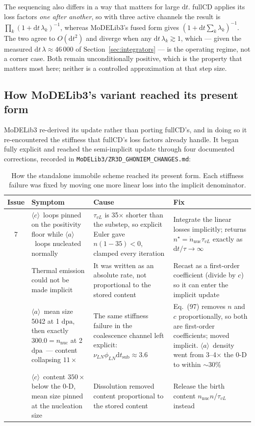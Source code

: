\documentclass[11pt,a4paper]{article}
\newcommand{\code}[1]{\texttt{\small #1}}
\newcommand{\dpa}{\ensuremath{\mathrm{dpa}}}
\newcommand{\aloop}{\ensuremath{\langle a\rangle}}
\newcommand{\cloop}{\ensuremath{\langle c\rangle}}
\begin{document}
The sequencing also differs in a way that matters for large $\mathrm dt$.
fullCD applies its loss factors \emph{one after another}, so with three active
channels the result is $\prod_k (1+\mathrm dt\,\lambda_k)^{-1}$, whereas
MoDELib3's fused form gives $(1+\mathrm dt\sum_k \lambda_k)^{-1}$. The two agree
to $O(\mathrm dt^2)$ and diverge when any $\mathrm dt\,\lambda_k \gtrsim 1$,
which --- given the measured $\mathrm dt\,\lambda \approx 46\,000$ of
Section~\ref{sec:integrators} --- is the operating regime, not a corner case.
Both remain unconditionally positive, which is the property that matters most
here; neither is a controlled approximation at that step size.

\subsection{How MoDELib3's variant reached its present form}

MoDELib3 re-derived its update rather than porting fullCD's, and in doing so it
re-encountered the stiffness that fullCD's loss factors already handle. It began
fully explicit and reached the semi-implicit update through four documented
corrections, recorded in \code{MoDELib3/ZR3D\_GHONIEM\_CHANGES.md}:

\begin{table}[htb]
\centering
\caption{How the standalone immobile scheme reached its present form. Each
stiffness failure was fixed by moving one more linear loss into the implicit
denominator.}
\label{tab:evolution}
\begin{tabular}{cp{4.1cm}p{4.3cm}p{4.3cm}}
\toprule
Issue & Symptom & Cause & Fix \\
\midrule
7 & \cloop\ loops pinned on the positivity floor while \aloop\ loops
    nucleated normally
  & $\tau_{vL}$ is 35$\times$ shorter than the substep, so explicit Euler gave
    $n(1-35)<0$, clamped every iteration
  & Integrate the linear losses implicitly; returns
    $n^\star=\dot n_{\mathrm{nuc}}\tau_{vL}$ exactly as
    $\mathrm dt/\tau\to\infty$ \\
\addlinespace
8 & Thermal emission could not be made implicit
  & It was written as an absolute rate, not proportional to the stored content
  & Recast as a first-order coefficient (divide by $c$) so it can enter the
    implicit update \\
\addlinespace
14 & \aloop\ mean size 5042 at 1 \dpa, then exactly $300.0=n_{\mathrm{nuc}}$ at
     2 \dpa\ --- content collapsing $11\times$
   & The same stiffness failure in the coalescence channel left explicit:
     $\nu_{LN}\phi_{LN}\mathrm dt_{\mathrm{sub}}\approx3.6$
   & Eq.~(97) removes $n$ and $c$ proportionally, so both are first-order
     coefficients; moved implicit. \aloop\ density went from 3--4$\times$ the
     0-D to within ${\sim}30\%$ \\
\addlinespace
15 & \cloop\ content $350\times$ below the 0-D, mean size pinned at the
     nucleation size
   & Dissolution removed content proportional to the stored content
   & Release the birth content $n_{\mathrm{nuc}}n/\tau_{vL}$ instead \\
\bottomrule
\end{tabular}
\end{table}
\end{document}
